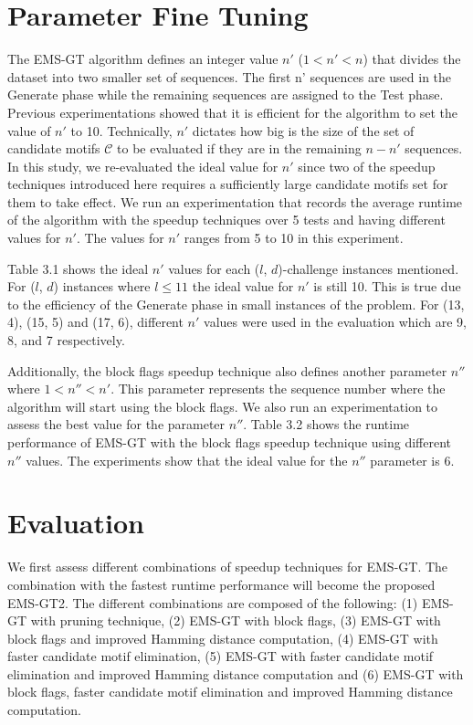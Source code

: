 
\section{Parameter Fine Tuning}
The EMS-GT algorithm defines an integer value $n'$ ($1 < n' < n$) that divides the dataset into two smaller set of sequences. The first n' sequences are used in the Generate phase while the remaining sequences are assigned to the Test phase. Previous experimentations \cite{sia2015} showed that it is efficient for the algorithm to set the value of $n'$ to 10. Technically, $n'$ dictates how big is the size of the set of candidate motifs $\mathcal{C}$ to be evaluated if they are in the remaining $n - n'$ sequences. In this study, we re-evaluated the ideal value for $n'$ since two of the speedup techniques introduced here requires a sufficiently large candidate motifs set for them to take effect. We run an experimentation that records the average runtime of the algorithm with the speedup techniques over 5 tests and having different values for $n'$. The values for $n'$ ranges from 5 to 10 in this experiment.


Table 3.1 shows the ideal $n'$ values for each ($l$, $d$)-challenge instances mentioned. For ($l$, $d$) instances where $l \leq 11$ the ideal value for $n'$ is still 10. This is true due to the efficiency of the Generate phase in small instances of the problem. For (13, 4), (15, 5) and (17, 6), different $n'$ values were used in the evaluation which are 9, 8, and 7 respectively.



Additionally, the block flags speedup technique also defines another parameter $n''$ where $1 < n'' < n'$. This parameter represents the sequence number where the algorithm will start using the block flags. We also run an experimentation to assess the best value for the parameter $n''$. Table 3.2 shows the runtime performance of EMS-GT with the block flags speedup technique using different $n''$ values. The experiments show that the ideal value for the $n''$ parameter is 6.



\section{Evaluation}
We first assess different combinations of speedup techniques for EMS-GT. The combination with the fastest runtime performance will become the proposed EMS-GT2. The different combinations are composed of the following: (1) EMS-GT with pruning technique, (2) EMS-GT with block flags, (3) EMS-GT with block flags and improved Hamming distance computation, (4) EMS-GT with faster candidate motif elimination, (5) EMS-GT with faster candidate motif elimination and improved Hamming distance computation and (6) EMS-GT with block flags, faster candidate motif elimination and improved Hamming distance computation. 

